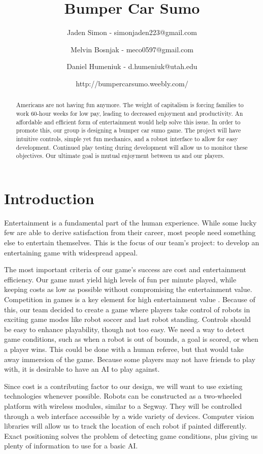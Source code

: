\documentclass[11pt]{ieeeconf}
\title{Bumper Car Sumo}
\author{Jaden Simon - simonjaden223@gmail.com \\ \and
	   Melvin Bosnjak - meco0597@gmail.com \\ \and
	   Daniel Humeniuk - d.humeniuk@utah.edu \\ \and
	   http://bumpercarsumo.weebly.com/}
\begin{document}
\maketitle

\begin{abstract}
Americans are not having fun anymore. The weight of capitalism is forcing families to work 60-hour weeks for low pay, leading to decreased enjoyment and productivity. An affordable and efficient form of entertainment would help solve this issue. In order to promote this, our group is designing a bumper car sumo game. The project will have intuitive controls, simple yet fun mechanics, and a robust interface to allow for easy development. Continued play testing during development will allow us to monitor these objectives. Our ultimate goal is mutual enjoyment between us and our players.
\end{abstract}

\section{Introduction}
Entertainment is a fundamental part of the human experience. While some lucky few are able to derive satisfaction from their career, most people need something else to entertain themselves. This is the focus of our team's project: to develop an entertaining game with widespread appeal.

 The most important criteria of our game’s success are cost and entertainment efficiency. Our game must yield high levels of fun per minute played, while keeping costs as low as possible without compromising the entertainment value. Competition in games is a key element for high entertainment value \cite{vord:03}.  Because of this, our team decided to create a game where players take control of robots in exciting game modes like robot soccer and last robot standing. Controls should be easy to enhance playability, though not too easy. We need a way to detect game conditions, such as when a robot is out of bounds, a goal is scored, or when a player wins. This could be done with a human referee, but that would take away immersion of the game. Because some players may not have friends to play with, it is desirable to have an AI to play against. 

Since cost is a contributing factor to our design, we will want to use existing technologies whenever possible. Robots can be constructed as a two-wheeled platform with wireless modules, similar to a Segway. They will be controlled through a web interface accessible by a wide variety of devices. Computer vision libraries will allow us to track the location of each robot if painted differently. Exact positioning solves the problem of detecting game conditions, plus giving us plenty of information to use for a basic AI. 
\end{document}
